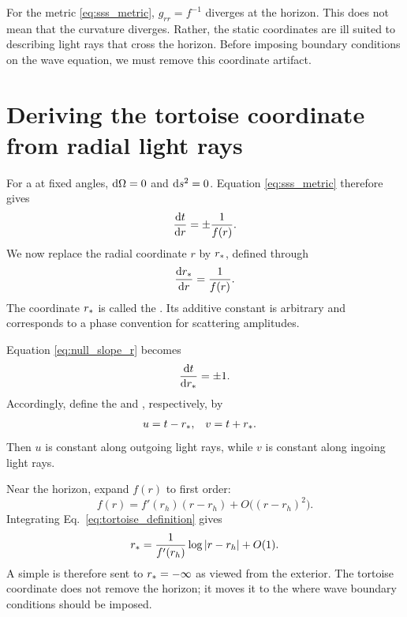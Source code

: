 For the metric \eqref{eq:sss_metric}, $g_{rr}=f^{-1}$ diverges at the horizon. This does not mean that the curvature diverges. Rather, the static coordinates are ill suited to describing light rays that cross the horizon. Before imposing boundary conditions on the wave equation, we must remove this coordinate artifact.

\section{Deriving the tortoise coordinate from radial light rays}

For a  at fixed angles, $\mathrm{d}\Omega=0$ and $\mathrm{d} s^2=0$. Equation \eqref{eq:sss_metric} therefore gives
\begin{equation}
\frac{\mathrm{d} t}{\mathrm{d} r}
=
\mathord{\pm}\frac{1}{f(r)}.
\label{eq:null_slope_r}
\end{equation}
We now replace the radial coordinate $r$ by $r_*$, defined through
\begin{equation}
\frac{\mathrm{d} r_*}{\mathrm{d} r}
=
\frac{1}{f(r)}.
\label{eq:tortoise_definition}
\end{equation}
The coordinate $r_*$ is called the . Its additive constant is arbitrary and corresponds to a phase convention for scattering amplitudes.

Equation \eqref{eq:null_slope_r} becomes
\begin{equation}
\frac{\mathrm{d} t}{\mathrm{d} r_*}
=
\mathord{\pm}1.
\end{equation}
Accordingly, define the  and , respectively, by
\begin{align}
u&=t-r_*,
&
v&=t+r_*.
\label{eq:null_coordinates}
\end{align}
Then $u$ is constant along outgoing light rays, while $v$ is constant along ingoing light rays.

Near the horizon, expand $f(r)$ to first order:
\begin{equation}
f(r)
=
f'(r_h)(r-r_h)
+O\bigl((r-r_h)^2\bigr).
\end{equation}
Integrating Eq.~\eqref{eq:tortoise_definition} gives
\begin{equation}
r_*
=
\frac{1}{f'(r_h)}
\log|r-r_h|
+O(1).
\label{eq:tortoise_near_horizon}
\end{equation}
A simple  is therefore sent to $r_*=-\infty$ as viewed from the exterior. The tortoise coordinate does not remove the horizon; it moves it to the  where wave boundary conditions should be imposed.

